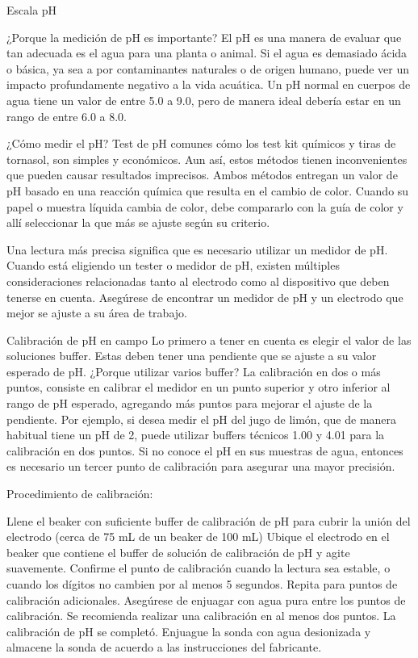 Escala pH

¿Porque la medición de pH es importante?
El pH es una manera de evaluar que tan adecuada es el agua para una planta o animal.  Si el agua es demasiado ácida o básica, ya sea a por contaminantes naturales o de origen humano, puede ver un impacto profundamente negativo a la vida acuática.  Un pH normal en cuerpos de agua tiene un valor de entre 5.0 a 9.0, pero de manera ideal debería estar en un rango de entre 6.0 a 8.0.

¿Cómo medir el pH?
Test de pH comunes cómo los test kit químicos y tiras de tornasol, son simples y económicos. Aun así, estos métodos tienen inconvenientes que pueden causar resultados imprecisos. Ambos métodos entregan un valor de pH basado en una reacción química que resulta en el cambio de color. Cuando su papel o muestra líquida cambia de color, debe compararlo con la guía de color y allí seleccionar la que más se ajuste según su criterio.

Una lectura más precisa significa que es necesario utilizar un medidor de pH. Cuando está eligiendo un tester o medidor de pH, existen múltiples consideraciones relacionadas tanto al electrodo como al dispositivo que deben tenerse en cuenta. Asegúrese de encontrar un medidor de pH y un electrodo que mejor se ajuste a su área de trabajo.

Calibración de pH en campo
Lo primero a tener en cuenta es elegir el valor de las soluciones buffer. Estas deben tener una pendiente que se ajuste a su valor esperado de pH. ¿Porque utilizar varios buffer? La calibración en dos o más puntos, consiste en calibrar el medidor en un punto superior y otro inferior al rango de pH esperado, agregando más puntos para mejorar el ajuste de la pendiente. Por ejemplo, si desea medir el pH del jugo de limón, que de manera habitual tiene un pH de 2, puede utilizar buffers técnicos 1.00 y 4.01 para la calibración en dos puntos. Si no conoce el pH en sus muestras de agua, entonces es necesario un tercer punto de calibración para asegurar una mayor precisión.

Procedimiento de calibración:

Llene el beaker con suficiente buffer de calibración de pH para cubrir la unión del electrodo (cerca de 75 mL de un beaker de 100 mL)
Ubique el electrodo en el beaker que contiene el buffer de solución de calibración de pH y agite suavemente.
Confirme el punto de calibración cuando la lectura sea estable, o cuando los dígitos no cambien por al menos 5 segundos.
Repita para puntos de calibración adicionales. Asegúrese de enjuagar con agua pura entre los puntos de calibración. Se recomienda realizar una calibración en al menos dos puntos.
La calibración de pH se completó. Enjuague la sonda con agua desionizada y almacene la sonda de acuerdo a las instrucciones del fabricante.

